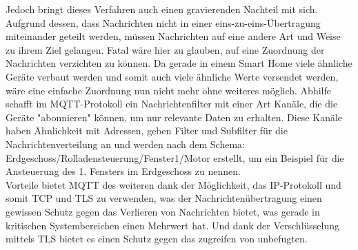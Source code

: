  
Jedoch bringt dieses Verfahren auch einen gravierenden Nachteil mit sich. Aufgrund dessen, dass Nachrichten nicht in einer eins-zu-eins-Übertragung miteinander geteilt werden, müssen Nachrichten auf eine andere Art und Weise zu ihrem Ziel gelangen. Fatal wäre hier zu glauben, auf eine Zuordnung der Nachrichten verzichten zu können. Da gerade in einem Smart Home viele ähnliche Geräte verbaut werden und somit auch viele ähnliche Werte versendet werden, wäre eine einfache Zuordnung nun nicht mehr ohne weiteres möglich.
Abhilfe schafft im MQTT-Protokoll ein Nachrichtenfilter mit einer Art Kanäle, die die Geräte "abonnieren" können, um nur relevante Daten zu erhalten\cite{b1}. Diese Kanäle haben Ähnlichkeit mit Adressen, geben Filter und Subfilter für die Nachrichtenverteilung an und werden nach dem Schema: \textsf{Erdgeschoss/Rolladensteuerung/Fenster1/Motor} erstellt, um ein Beispiel für die Ansteuerung des 1. Fensters im Erdgeschoss zu nennen. \\
Vorteile bietet MQTT des weiteren dank der Möglichkeit, das IP-Protokoll und somit TCP und TLS zu verwenden, was der Nachrichtenübertragung einen gewissen Schutz gegen das Verlieren von Nachrichten bietet, was gerade in kritischen Systembereichen einen Mehrwert hat. Und dank der Verschlüsselung mittels TLS bietet es einen Schutz gegen das zugreifen von unbefugten.